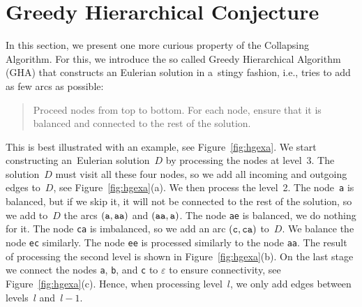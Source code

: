 \clearpage
\section{Greedy Hierarchical Conjecture}
\label{sec:greedy_hier}
In this section, we present one more curious property of the Collapsing Algorithm. For this, we introduce the so called Greedy Hierarchical Algorithm (GHA) that constructs an Eulerian solution in a~stingy fashion, i.e., tries to add as few arcs as possible:
\begin{quote}
Proceed nodes from top to bottom. For each node, ensure that it is balanced and connected to the rest of the solution.
\end{quote}
This is best illustrated with an example, see Figure~\ref{fig:hgexa}. We start constructing an~Eulerian solution~$D$ by processing the nodes at level~$3$. The solution~$D$ must visit all these four nodes, so we add all incoming and outgoing edges to~$D$, see Figure~\ref{fig:hgexa}(a). We then process the level~2. The node~{\tt a} is balanced, but if we skip it, it will not be connected to the rest of the solution, so we add to~$D$ the arcs $({\tt a}, {\tt aa})$ and $({\tt aa}, {\tt a})$. The node {\tt ae} is balanced, we do nothing for it. The node {\tt ca} is imbalanced, so we add an arc $({\tt c}, {\tt ca})$ to~$D$. We balance the node {\tt ec} similarly. The node {\tt ee} is processed similarly to the node {\tt aa}. The result of processing the second level is shown in Figure~\ref{fig:hgexa}(b). On the last stage we connect the nodes {\tt a}, {\tt b}, and {\tt c} to $\varepsilon$ to ensure connectivity, see Figure~\ref{fig:hgexa}(c). Hence, when processing level~$l$, we only add edges between levels~$l$ and~$l-1$.

